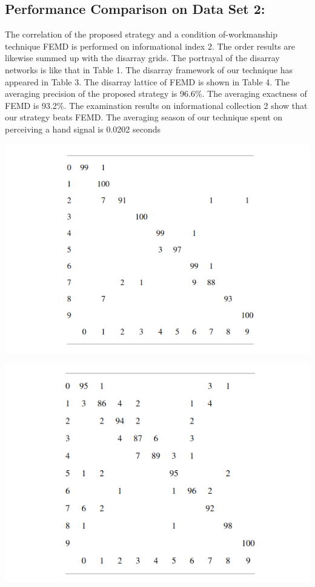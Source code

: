 \documentclass[a4paper]{article}
\begin{document}
\subsection{Performance Comparison on Data Set 2:}
The correlation of the proposed strategy and a condition of-workmanship technique FEMD is performed on informational index 2. The order results are likewise summed up with the disarray grids. The portrayal of the disarray networks is like that in Table 1. The disarray framework of our technique has appeared in Table 3. The disarray lattice of FEMD is shown in Table 4. The averaging precision of the proposed strategy is 96.6\%. The averaging exactness of FEMD is 93.2\%. The examination results on informational collection 2 show that our strategy beats FEMD. The averaging season of our technique spent on perceiving a hand signal is 0.0202 seconds
\cite{DUMMY:1}
\begin{center}
\includegraphics[scale=0.3]{Table3}
\end{center}


\begin{center}
\includegraphics[scale=0.3]{Table4}
\end{center}

 

\end{document}
